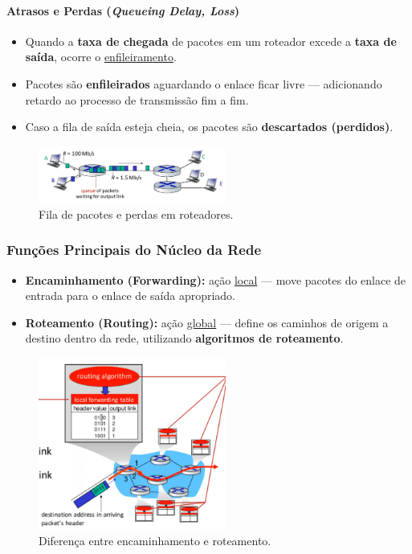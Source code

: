     \paragraph{Atrasos e Perdas (\textit{Queueing Delay, Loss})}
    \begin{itemize}
        \item Quando a \textbf{taxa de chegada} de pacotes em um roteador excede a \textbf{taxa de saída}, ocorre o \underline{enfileiramento}.
        \item Pacotes são \textbf{enfileirados} aguardando o enlace ficar livre — adicionando retardo ao processo de transmissão fim a fim.
        \item Caso a fila de saída esteja cheia, os pacotes são \textbf{descartados (perdidos)}.
    \end{itemize}

    \begin{figure}[H]
        \centering
        \includegraphics[width=0.55\textwidth]{img/cap-01/fila-e-perda.png}
        \caption{Fila de pacotes e perdas em roteadores.}
    \end{figure}

    \subsubsection*{Funções Principais do Núcleo da Rede}
    \begin{itemize}
        \item \textbf{Encaminhamento (Forwarding):} ação \underline{local} — move pacotes do enlace de entrada para o enlace de saída apropriado.
        \item \textbf{Roteamento (Routing):} ação \underline{global} — define os caminhos de origem a destino dentro da rede, utilizando \textbf{algoritmos de roteamento}.
    \end{itemize}

    \begin{figure}[H]
        \centering
        \includegraphics[width=0.55\textwidth]{img/cap-01/encaminhamento-roteamento.png}
        \caption{Diferença entre encaminhamento e roteamento.}
    \end{figure}

